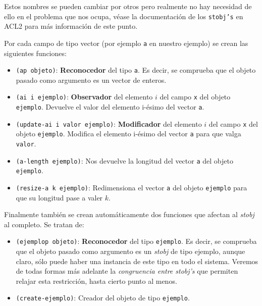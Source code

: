 \documentclass[a4paper,10pt]{article}
\begin{document}
\par \vspace{10pt}

Estos nombres se pueden cambiar por otros pero realmente no hay necesidad de ello en el problema que nos ocupa, véase la documentación de los \texttt{stobj's} en ACL2 para más información de este punto.

\par \vspace{10pt}

Por cada campo de tipo vector (por ejemplo \texttt{a} en nuestro ejemplo) se crean las siguientes funciones:

\par \vspace{10pt}

\begin{itemize}
	\item \texttt{(ap objeto)}: \textbf{Reconocedor} del tipo \texttt{a}. Es decir, se comprueba que el objeto pasado como argumento es un vector de enteros.
	\item \texttt{(ai i ejemplo)}: \textbf{Observador} del elemento $i$ del campo \texttt{x} del objeto \texttt{ejemplo}. Devuelve el valor del elemento i-ésimo del vector \texttt{a}.
	\item \texttt{(update-ai i valor ejemplo)}: \textbf{Modificador} del elemento $i$ del campo \texttt{x} del objeto \texttt{ejemplo}. Modifica el elemento i-ésimo del vector \texttt{a} para que valga \texttt{valor}.
	\item \texttt{(a-length ejemplo)}: Nos devuelve la longitud del vector \texttt{a} del objeto \texttt{ejemplo}.
	\item \texttt{(resize-a k ejemplo)}: Redimensiona el vector \texttt{a} del objeto \texttt{ejemplo} para que su longitud pase a valer $k$.
\end{itemize}

\par \vspace{10pt}

Finalmente también se crean automáticamente dos funciones que afectan al \emph{stobj} al completo. Se tratan de:

\par \vspace{10pt}

\begin{itemize}
	\item \texttt{(ejemplop objeto)}: \textbf{Reconocedor} del tipo \texttt{ejemplo}. Es decir, se comprueba que el objeto pasado como argumento es un \emph{stobj} de tipo ejemplo, aunque claro, sólo puede haber una instancia de este tipo en todo el sistema. Veremos de todas formas más adelante la \emph{congruencia entre stobj's} que permiten relajar esta restricción, hasta cierto punto al menos.
	\item \texttt{(create-ejemplo)}: Creador del objeto de tipo \texttt{ejemplo}.
\end{itemize}
\end{document}
